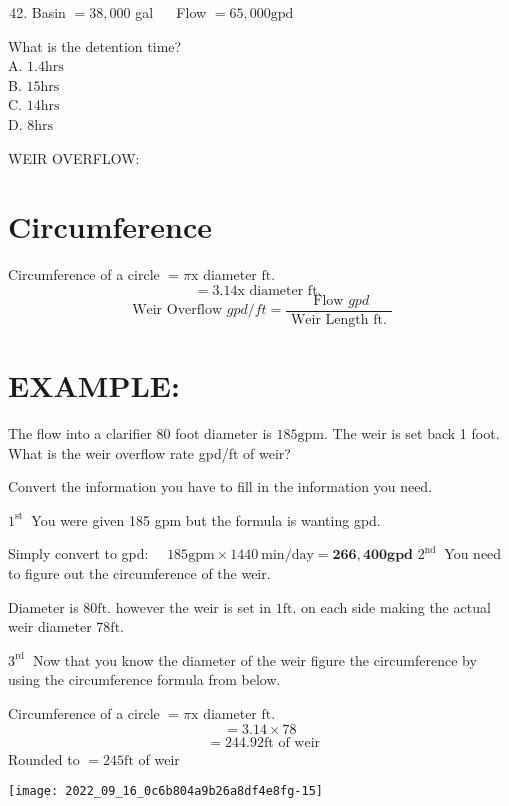 \begin{enumerate}
\begin{enumerate}
  \setcounter{enumi}{41}
  \item Basin $=38,000$ gal $\quad$ Flow $=65,000 \mathrm{gpd}$
\end{enumerate}
What is the detention time?\\
A. $1.4 \mathrm{hrs}$\\
B. $15 \mathrm{hrs}$\\
C. $14 \mathrm{hrs}$\\
D. $8 \mathrm{hrs}$

WEIR OVERFLOW:

\section{Circumference}
Circumference of a circle $=\pi \mathrm{x}$ diameter $\mathrm{ft}$.
$$
=3.14 \mathrm{x} \text { diameter } \mathrm{ft} \text {. }
$$
$$
\text { Weir Overflow } g p d / f t=\frac{\text { Flow } g p d}{\text { Weir Length ft. }}
$$

\section{EXAMPLE:}
The flow into a clarifier 80 foot diameter is $185 \mathrm{gpm}$. The weir is set back 1 foot. What is the weir overflow rate gpd/ft of weir?

Convert the information you have to fill in the information you need.

$1^{\text {st }}$ You were given 185 gpm but the formula is wanting gpd.

Simply convert to gpd: $\quad 185 \mathrm{gpm} \times 1440 \mathrm{~min} / \mathrm{day}=\mathbf{2 6 6 , 4 0 0} \mathbf{g p d}$ $2^{\text {nd }}$ You need to figure out the circumference of the weir.

Diameter is $80 \mathrm{ft}$. however the weir is set in $1 \mathrm{ft}$. on each side making the actual weir diameter $78 \mathrm{ft}$.

$3^{\text {rd }}$ Now that you know the diameter of the weir figure the circumference by using the circumference formula from below.

Circumference of a circle $=\pi \mathrm{x}$ diameter $\mathrm{ft}$.
$$
=3.14 \times 78
$$
$$
\begin{aligned}
& =244.92 \mathrm{ft} \text { of weir }
\end{aligned}
$$
Rounded to $=245 \mathrm{ft}$ of weir

\texttt{[image: 2022\_09\_16\_0c6b804a9b26a8df4e8fg-15]}


\end{enumerate}
